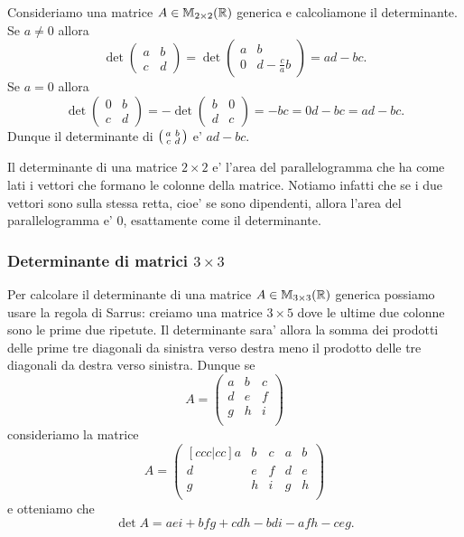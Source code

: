 Consideriamo una matrice $A \in \mathbb{M}_{2 \times 2}(\mathbb{R})$ generica e calcoliamone il determinante. Se $a \neq 0$ allora \begin{equation*}
    \det \begin{pmatrix} a & b \\ c & d \end{pmatrix} = \det \begin{pmatrix} a & b \\ 0 & d - \frac{c}{a}b \end{pmatrix} = ad - bc.
\end{equation*}
Se $a = 0$ allora \begin{equation*}
\det \begin{pmatrix} 0 & b \\ c & d \end{pmatrix} = -\det \begin{pmatrix} b & 0 \\ d & c \end{pmatrix} = -bc = 0d - bc = ad - bc.
\end{equation*}
Dunque il determinante di $\begin{psmallmatrix} a & b \\ c & d \end{psmallmatrix}$ e' $ad - bc$.

Il determinante di una matrice $2 \times 2$ e' l'area del parallelogramma che ha come lati i vettori che formano le colonne della matrice. Notiamo infatti che se i due vettori sono sulla stessa retta, cioe' se sono dipendenti, allora l'area del parallelogramma e' 0, esattamente come il determinante.

\subsubsection{Determinante di matrici $3 \times 3$}

Per calcolare il determinante di una matrice $A \in \mathbb{M}_{3 \times 3}(\mathbb{R})$ generica possiamo usare la regola di Sarrus: creiamo una matrice $3 \times 5$ dove le ultime due colonne sono le prime due ripetute. Il determinante sara' allora la somma dei prodotti delle prime tre diagonali da sinistra verso destra meno il prodotto delle tre diagonali da destra verso sinistra.
Dunque se \[
    A = \begin{pmatrix}
        a & b & c \\
        d & e & f \\
        g & h & i \\
    \end{pmatrix}
\] consideriamo la matrice \[
    A = \begin{pmatrix}[ccc|cc]
        a & b & c & a & b \\
        d & e & f & d & e\\
        g & h & i & g & h\\
    \end{pmatrix}
\] e otteniamo che \[
    \det A = aei + bfg + cdh - bdi - afh - ceg.    
\]

